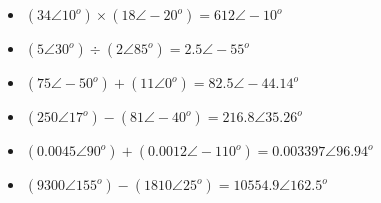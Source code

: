 \vskip 10pt

\begin{itemize}
\item{} $(34 \angle 10^o) \times (18 \angle -20^o) = 612 \angle -10^o$ 
\vskip 5pt
\item{} $(5 \angle 30^o) \div (2 \angle 85^o) = 2.5 \angle -55^o$ 
\vskip 5pt
\item{} $(75 \angle -50^o) + (11 \angle 0^o) = 82.5 \angle -44.14^o$ 
\vskip 5pt
\item{} $(250 \angle 17^o) - (81 \angle -40^o) = 216.8 \angle 35.26^o$ 
\vskip 5pt
\item{} $(0.0045 \angle 90^o) + (0.0012 \angle -110^o) = 0.003397 \angle 96.94^o$ 
\vskip 5pt
\item{} $(9300 \angle 155^o) - (1810 \angle 25^o) = 10554.9 \angle 162.5^o$ 
\end{itemize}












